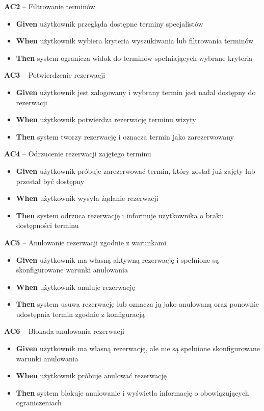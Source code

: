 \documentclass[12pt,a4paper]{article}
\begin{document}
\textbf{AC2} -- Filtrowanie terminów
\begin{itemize}[itemsep=2pt]
\item \textbf{Given} użytkownik przegląda dostępne terminy specjalistów
\item \textbf{When} użytkownik wybiera kryteria wyszukiwania lub filtrowania terminów
\item \textbf{Then} system ogranicza widok do terminów spełniających wybrane kryteria
\end{itemize}

\textbf{AC3} -- Potwierdzenie rezerwacji
\begin{itemize}[itemsep=2pt]
\item \textbf{Given} użytkownik jest zalogowany i wybrany termin jest nadal dostępny do rezerwacji
\item \textbf{When} użytkownik potwierdza rezerwację terminu wizyty
\item \textbf{Then} system tworzy rezerwację i oznacza termin jako zarezerwowany
\end{itemize}

\textbf{AC4} -- Odrzucenie rezerwacji zajętego terminu
\begin{itemize}[itemsep=2pt]
\item \textbf{Given} użytkownik próbuje zarezerwować termin, który został już zajęty lub przestał być dostępny
\item \textbf{When} użytkownik wysyła żądanie rezerwacji
\item \textbf{Then} system odrzuca rezerwację i informuje użytkownika o braku dostępności terminu
\end{itemize}

\textbf{AC5} -- Anulowanie rezerwacji zgodnie z warunkami
\begin{itemize}[itemsep=2pt]
\item \textbf{Given} użytkownik ma własną aktywną rezerwację i spełnione są skonfigurowane warunki anulowania
\item \textbf{When} użytkownik anuluje rezerwację
\item \textbf{Then} system usuwa rezerwację lub oznacza ją jako anulowaną oraz ponownie udostępnia termin zgodnie z konfiguracją
\end{itemize}

\textbf{AC6} -- Blokada anulowania rezerwacji
\begin{itemize}[itemsep=2pt]
\item \textbf{Given} użytkownik ma własną rezerwację, ale nie są spełnione skonfigurowane warunki anulowania
\item \textbf{When} użytkownik próbuje anulować rezerwację
\item \textbf{Then} system blokuje anulowanie i wyświetla informację o obowiązujących ograniczeniach
\end{itemize}
\end{document}
